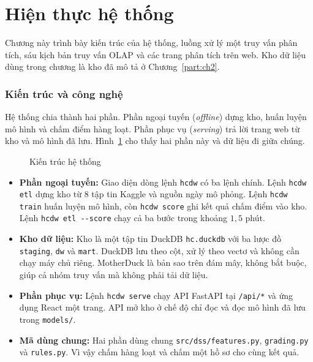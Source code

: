 \part{Hiện thực hệ thống}
\label{part:ch3}
\begingroup
\sloppy

Chương này trình bày kiến trúc của hệ thống, luồng xử lý một truy vấn phân tích, sáu kịch bản truy vấn OLAP và các trang phân tích trên web. Kho dữ liệu dùng trong chương là kho đã mô tả ở Chương~\ref{part:ch2}.

\section{Kiến trúc và công nghệ}
\label{sec:architecture}
Hệ thống chia thành hai phần. Phần ngoại tuyến (\textit{offline}) dựng kho, huấn luyện mô hình và chấm điểm hàng loạt. Phần phục vụ (\textit{serving}) trả lời trang web từ kho và mô hình đã lưu. Hình~\ref{fig:system_architecture} cho thấy hai phần này và dữ liệu đi giữa chúng.

\begin{figure}[H]
	\centering
	\caption{Kiến trúc hệ thống}
	\label{fig:system_architecture}
\end{figure}

\begin{itemize}[topsep=0pt, itemsep=1pt]
	\item \textbf{Phần ngoại tuyến:} Giao diện dòng lệnh \texttt{hcdw} có ba lệnh chính. Lệnh \texttt{hcdw etl} dựng kho từ $8$ tập tin Kaggle và nguồn ngày mô phỏng. Lệnh \texttt{hcdw train} huấn luyện mô hình, còn \texttt{hcdw score} ghi kết quả chấm điểm vào kho. Lệnh \texttt{hcdw etl -{}-score} chạy cả ba bước trong khoảng $1{,}5$ phút.
	\item \textbf{Kho dữ liệu:} Kho là một tập tin DuckDB \texttt{hc.duckdb} với ba lược đồ \texttt{staging}, \texttt{dw} và \texttt{mart}. DuckDB lưu theo cột, xử lý theo vectơ và không cần chạy máy chủ riêng. MotherDuck là bản sao trên đám mây, không bắt buộc, giúp cả nhóm truy vấn mà không phải tải dữ liệu.
	\item \textbf{Phần phục vụ:} Lệnh \texttt{hcdw serve} chạy API FastAPI tại \texttt{/api/*} và ứng dụng React một trang. API mở kho ở chế độ chỉ đọc và đọc mô hình đã lưu trong \texttt{models/}.
	\item \textbf{Mã dùng chung:} Hai phần dùng chung \texttt{src/dss/features.py}, \texttt{grading.py} và \texttt{rules.py}. Vì vậy chấm hàng loạt và chấm một hồ sơ cho cùng kết quả.
\end{itemize}

